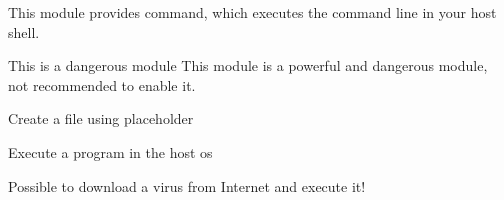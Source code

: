 
This module provides  command, which executes the command line in your host shell.

\begin{danger}{This is a dangerous module}
    This module is a powerful and dangerous module, not recommended to enable it.
\end{danger}


\begin{example}{Create a file using placeholder}
\end{example}

\begin{example}{Execute a program in the host os}
\end{example}

\begin{example}{Possible to download a virus from Internet and execute it!}
\end{example}